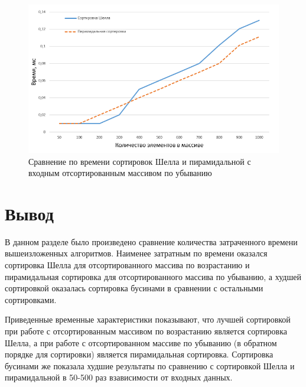 \begin{figure}[h]
	\centering
	\includegraphics[height=0.3\textheight]{img/rsort_2.png}
	\caption{Сравнение по времени сортировок Шелла и пирамидальной с входным отсортированным массивом по убыванию}
	\label{plt:rsort_2}
\end{figure}

\clearpage

\section{Вывод}
В данном разделе было произведено сравнение количества затраченного времени вышеизложенных алгоритмов. Наименее затратным по времени оказался сортировка Шелла для отсортированного массива по возрастанию и пирамидальная сортировка для отсортированного массива по убыванию, а худшей сортировкой оказалась сортировка бусинами в сравнении с остальными сортировками.

Приведенные временные характеристики показывают, что лучшей сортировкой при работе с отсортированным массивом по возрастанию является сортировка Шелла, а при работе с отсортированном массиве по убыванию (в обратном порядке для сортировки) является пирамидальная сортировка. Сортировка бусинами же показала худшие результаты по сравнению с сортировкой Шелла и пирамидальной в 50-500 раз взависимости от входных данных.
